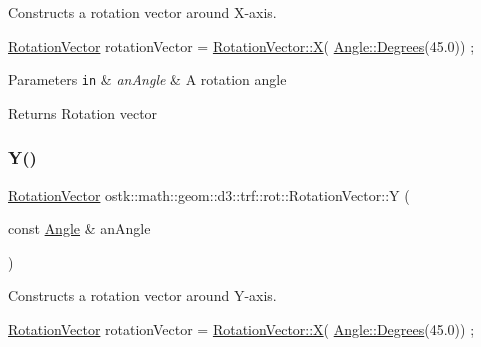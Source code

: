 Constructs a rotation vector around X-\/axis. 


\begin{DoxyCode}
\hyperlink{classostk_1_1math_1_1geom_1_1d3_1_1trf_1_1rot_1_1_rotation_vector_ad05e6af649dbdd145793773e2ab1cdce}{RotationVector} rotationVector = \hyperlink{classostk_1_1math_1_1geom_1_1d3_1_1trf_1_1rot_1_1_rotation_vector_af24a0322c5b9c2bbfb745468e97147e9}{RotationVector::X}(
      \hyperlink{classostk_1_1math_1_1geom_1_1_angle_a2cefda601167af07f61f0477776203ca}{Angle::Degrees}(45.0)) ;
\end{DoxyCode}



\begin{DoxyParams}[1]{Parameters}
\mbox{\tt in}  & {\em an\+Angle} & A rotation angle \\
\hline
\end{DoxyParams}
\begin{DoxyReturn}{Returns}
Rotation vector 
\end{DoxyReturn}
\mbox{\label{classostk_1_1math_1_1geom_1_1d3_1_1trf_1_1rot_1_1_rotation_vector_a2605678dcb011512cb5f8266cfd6eec5}} 
\subsubsection{\texorpdfstring{Y()}{Y()}}
{\footnotesize\ttfamily \hyperlink{classostk_1_1math_1_1geom_1_1d3_1_1trf_1_1rot_1_1_rotation_vector}{Rotation\+Vector} ostk\+::math\+::geom\+::d3\+::trf\+::rot\+::\+Rotation\+Vector\+::Y (\begin{DoxyParamCaption}\item[{const \hyperlink{classostk_1_1math_1_1geom_1_1_angle}{Angle} \&}]{an\+Angle }\end{DoxyParamCaption})\hspace{0.3cm}{\ttfamily [static]}}



Constructs a rotation vector around Y-\/axis. 


\begin{DoxyCode}
\hyperlink{classostk_1_1math_1_1geom_1_1d3_1_1trf_1_1rot_1_1_rotation_vector_ad05e6af649dbdd145793773e2ab1cdce}{RotationVector} rotationVector = \hyperlink{classostk_1_1math_1_1geom_1_1d3_1_1trf_1_1rot_1_1_rotation_vector_af24a0322c5b9c2bbfb745468e97147e9}{RotationVector::X}(
      \hyperlink{classostk_1_1math_1_1geom_1_1_angle_a2cefda601167af07f61f0477776203ca}{Angle::Degrees}(45.0)) ;
\end{DoxyCode}



